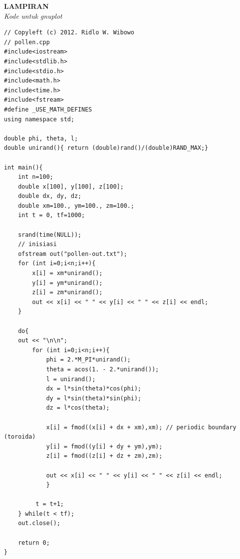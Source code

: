 \documentclass[paper=a4, fontsize=11pt]{scrartcl}
\numberwithin{equation}{section} %
\numberwithin{figure}{section} %
\numberwithin{table}{section} %
\begin{document}
\newpage
\textbf{LAMPIRAN}\\
\textit{Kode untuk gnuplot}
\lstset{frameround=fttt}
\begin{lstlisting}
// Copyleft (c) 2012. Ridlo W. Wibowo
// pollen.cpp
#include<iostream>
#include<stdlib.h>
#include<stdio.h>
#include<math.h>
#include<time.h>
#include<fstream>
#define _USE_MATH_DEFINES
using namespace std;

double phi, theta, l;
double unirand(){ return (double)rand()/(double)RAND_MAX;}

int main(){
    int n=100;
    double x[100], y[100], z[100];
    double dx, dy, dz;
    double xm=100., ym=100., zm=100.;
    int t = 0, tf=1000;

    srand(time(NULL));
    // inisiasi
    ofstream out("pollen-out.txt");
    for (int i=0;i<n;i++){
        x[i] = xm*unirand();
        y[i] = ym*unirand();
        z[i] = zm*unirand();
        out << x[i] << " " << y[i] << " " << z[i] << endl;
    }

    do{
	out << "\n\n";
        for (int i=0;i<n;i++){
            phi = 2.*M_PI*unirand();
            theta = acos(1. - 2.*unirand());
            l = unirand();
            dx = l*sin(theta)*cos(phi);
            dy = l*sin(theta)*sin(phi);
            dz = l*cos(theta);
            
            x[i] = fmod((x[i] + dx + xm),xm); // periodic boundary (toroida)
            y[i] = fmod((y[i] + dy + ym),ym);
            z[i] = fmod((z[i] + dz + zm),zm);
            
            out << x[i] << " " << y[i] << " " << z[i] << endl;
            }
         
         t = t+1;
    } while(t < tf);
    out.close();

    return 0;
}
\end{lstlisting}
\end{document}
